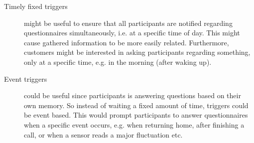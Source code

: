 \begin{description}
    \item[Timely fixed triggers] might be useful to ensure that all participants are notified regarding questionnaires simultaneously, i.e. at a specific time of day. This might cause gathered information to be more easily related. Furthermore, customers might be interested in asking participants regarding something, only at a specific time, e.g. in the morning (after waking up). 

    \item[Event triggers] could be useful since participants is answering questions based on their own memory. So instead of waiting a fixed amount of time, triggers could be event based. This would prompt participants to answer questionnaires when a specific event occurs, e.g. when returning home, after finishing a call, or when a sensor reads a major fluctuation etc.    
\end{description}    

